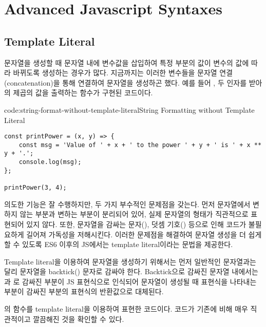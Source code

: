 \section{Advanced Javascript Syntaxes}\label{sect:advanced-javascript-syntaxes}

\subsection*{Template Literal}

문자열을 생성할 때 문자열 내에 변수값을 삽입하여 특정 부분의 값이 변수의 값에 따라 바뀌도록 생성하는 경우가 많다. 지금까지는 이러한 변수들을 문자열 연결(concatenation)을 통해 연결하여 문자열을 생성하곤 했다. 예를 들어 \은 ,  두 인자를 받아 의  제곱의 값을 출력하는 함수가 구현된 코드이다.

\begin{codeenv}{code:string-format-without-template-literal}{String Formatting without Template Literal}\begin{verbatim}
const printPower = (x, y) => {
    const msg = 'Value of ' + x + ' to the power ' + y + ' is ' + x ** y + '.';
    console.log(msg);
};

printPower(3, 4);
\end{verbatim}
\end{codeenv}

\은 의도한 기능은 잘 수행하지만, 두 가지 부수적인 문제점을 갖는다. 먼저  문자열에서 변하지 않는 부분과 변하는 부분이 분리되어 있어, 실제 문자열의 형태가 직관적으로 표현되어 있지 않다. 또한, 문자열을 감싸는 문자(), 덧셈 기호(\cd{+}) 등으로 인해 코드가 불필요하게 길어져 가독성을 저해시킨다. 이러한 문제점을 해결하여 문자열 생성을 더 쉽게 할 수 있도록 ES6 이후의 JS에서는 template literal이라는 문법을 제공한다.

Template literal을 이용하여 문자열을 생성하기 위해서는 먼저 일반적인 문자열과는 달리 문자열을 backtick() 문자로 감싸야 한다. Backtick으로 감싸진 문자열 내에서는 \cd{\$\{}과 \cd{\}}로 감싸진 부분이 JS 표현식으로 인식되어 문자열이 생성될 때 표현식을 나타내는 부분이 감싸진 부분의 표현식의 반환값으로 대체된다.

\은 의 함수를 template literal을 이용하여 표현한 코드이다. 코드가 기존에 비해 매우 직관적이고 깔끔해진 것을 확인할 수 있다.


